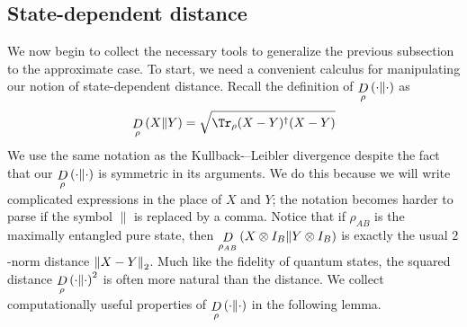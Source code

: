 \subsection{State-dependent distance}\label{subsection:state-dependent-distance}
We now begin to collect the necessary tools to generalize the previous subsection to the approximate case. To start, we need a convenient calculus for manipulating our notion of state-dependent distance. Recall the definition of $\mathop{D}\limits_{\rho}\left(\cdot\middle\| \cdot\right)$ as 
\begin{equation}
\drho{\rho}{X}{Y} = \sqrt{\Tr_\rho(X-Y)^\dagger(X-Y)}
\end{equation} 
We use the same notation as the Kullback-–Leibler divergence despite the fact that our $\mathop{D}\limits_{\rho}\left(\cdot\middle\| \cdot\right)$ is symmetric in its arguments. We do this because we will write complicated expressions in the place of $X$ and $Y$; the notation becomes harder to parse if the symbol $\|$ is replaced by a comma.
Notice that if $\rho_{AB}$ is the maximally entangled pure state, then $\mathop{D}\limits_{\rho_{AB}}\left(X\otimes I_B\middle\| Y\otimes I_B\right)$ is exactly the usual $2$-norm distance $\left\Vert X-Y\right\Vert_2$. Much like the fidelity of quantum states, the squared distance $\mathop{D}\limits_{\rho}\left(\cdot\middle\| \cdot\right)^2$ is often more natural than the distance. We collect computationally useful properties of $\mathop{D}\limits_{\rho}\left(\cdot\middle\| \cdot\right)$ in the following lemma.

